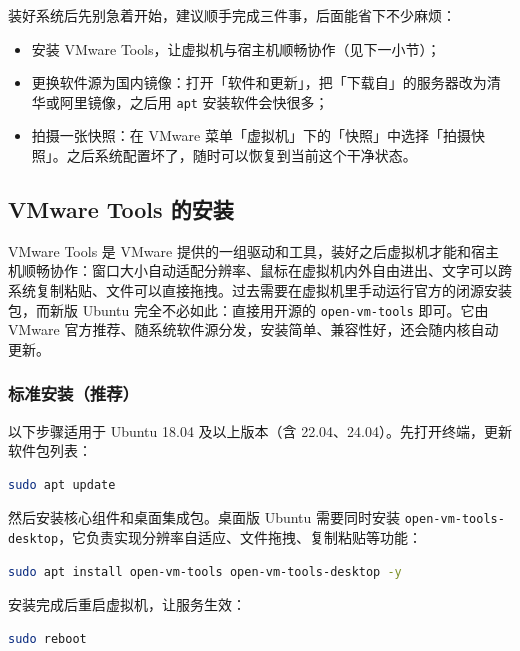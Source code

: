 \documentclass[12pt,a4paper]{ctexbook}
\begin{document}
装好系统后先别急着开始，建议顺手完成三件事，后面能省下不少麻烦：

\begin{itemize}
    \item 安装 VMware Tools，让虚拟机与宿主机顺畅协作（见下一小节）；
    \item 更换软件源为国内镜像：打开「软件和更新」，把「下载自」的服务器改为清华或阿里镜像，之后用 \texttt{apt} 安装软件会快很多；
    \item 拍摄一张快照：在 VMware 菜单「虚拟机」下的「快照」中选择「拍摄快照」。之后系统配置坏了，随时可以恢复到当前这个干净状态。
\end{itemize}

\subsection{VMware Tools 的安装}

VMware Tools 是 VMware 提供的一组驱动和工具，装好之后虚拟机才能和宿主机顺畅协作：窗口大小自动适配分辨率、鼠标在虚拟机内外自由进出、文字可以跨系统复制粘贴、文件可以直接拖拽。过去需要在虚拟机里手动运行官方的闭源安装包，而新版 Ubuntu 完全不必如此：直接用开源的 \texttt{open-vm-tools} 即可。它由 VMware 官方推荐、随系统软件源分发，安装简单、兼容性好，还会随内核自动更新。

\subsubsection{标准安装（推荐）}

以下步骤适用于 Ubuntu 18.04 及以上版本（含 22.04、24.04）。先打开终端，更新软件包列表：

\begin{lstlisting}[language=bash,title={更新软件包列表}]
    sudo apt update
\end{lstlisting}

然后安装核心组件和桌面集成包。桌面版 Ubuntu 需要同时安装 \texttt{open-vm-tools-}\allowbreak\texttt{desktop}，它负责实现分辨率自适应、文件拖拽、复制粘贴等功能：

\begin{lstlisting}[language=bash,title={安装 open-vm-tools 及桌面集成包}]
    sudo apt install open-vm-tools open-vm-tools-desktop -y
\end{lstlisting}

安装完成后重启虚拟机，让服务生效：

\begin{lstlisting}[language=bash,title={重启虚拟机}]
    sudo reboot
\end{lstlisting}
\end{document}
